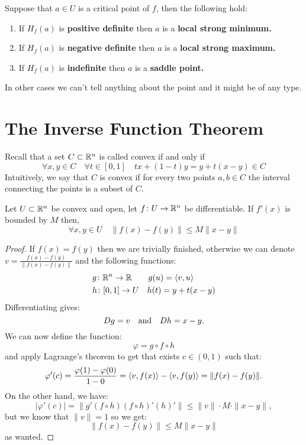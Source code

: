 \documentclass[11pt,a4paper]{article}
\begin{document}
\newpage

Suppose that $a \in U$ is a critical point of $f$, then the following
hold:
\begin{enumerate}
  \item If $H_f(a)$ is \textbf{positive definite} then $a$ is a 
  \textbf{local strong minimum.}
  \item If $H_f(a)$ is \textbf{negative definite} then $a$ is a 
  \textbf{local strong maximum.}
  \item If $H_f(a)$ is \textbf{indefinite} then $a$ is a 
  \textbf{saddle point.}
\end{enumerate}
In other cases we can't tell anything about the point and it might be
of any type.

\newpage

\section{The Inverse Function Theorem}
Recall that a set $C \subset \mathbb{R}^n$ is called convex if and only if
\[
  \forall x,y \in C \quad \forall t \in [0,1] \quad
  tx + (1-t)y = y + t(x-y) \in C
\]
Intuitively, we say that $C$ is convex if for every two points $a,b \in C$
the interval connecting the points is a subset of $C$.
\begin{proposition}
  Let $U \subset \mathbb{R}^n$ be convex and open, let $f \colon U \to \mathbb{R}^n$
  be differentiable. If $f'(x)$ is bounded by $M$ then,
  \[
     \forall x,y \in U \quad \|f(x) - f(y)\| \le M\|x - y\|
  \]
\end{proposition}
\begin{proof}
  If $f(x) = f(y)$ then we are trivially finished, otherwise we can
  denote $v = \frac{f(x) - f(y)}{\|f(x) - f(y)\|}$ and the following
  functions:
  \begin{align*}
    &g \colon \mathbb{R}^n \to \mathbb{R} \quad \quad g(u) = \langle v, u \rangle \\
    &h \colon [0,1] \to U \quad h(t) = y + t(x-y)
  \end{align*}
  Differentiating gives:
  \[
    Dg = v \quad \text{and} \quad Dh = x-y.
  \]
  We can now define the function:
  \[
    \varphi = g \circ f \circ h
  \]
  and apply Lagrange's theorem to get that exists $c \in (0,1)$ such that:
  \[
    \varphi'(c) = \frac{\varphi(1) - \varphi(0)}{1 - 0} = 
    \langle v, f(x) \rangle - \langle v, f(y) \rangle = \|f(x) - f(y)\|.
  \]
  On the other hand, we have:
  \[
    |\varphi'(c)| = \|g'(f \circ h)(f \circ h)'(h)'\| \le 
    \|v\| \cdot M \cdot \|x - y\|,
  \]
  but we know that $\|v\| = 1$ so we get:
  \[
    \|f(x) - f(y)\| \le M\|x - y\|
  \]
  as wanted.
\end{proof}
\end{document}
